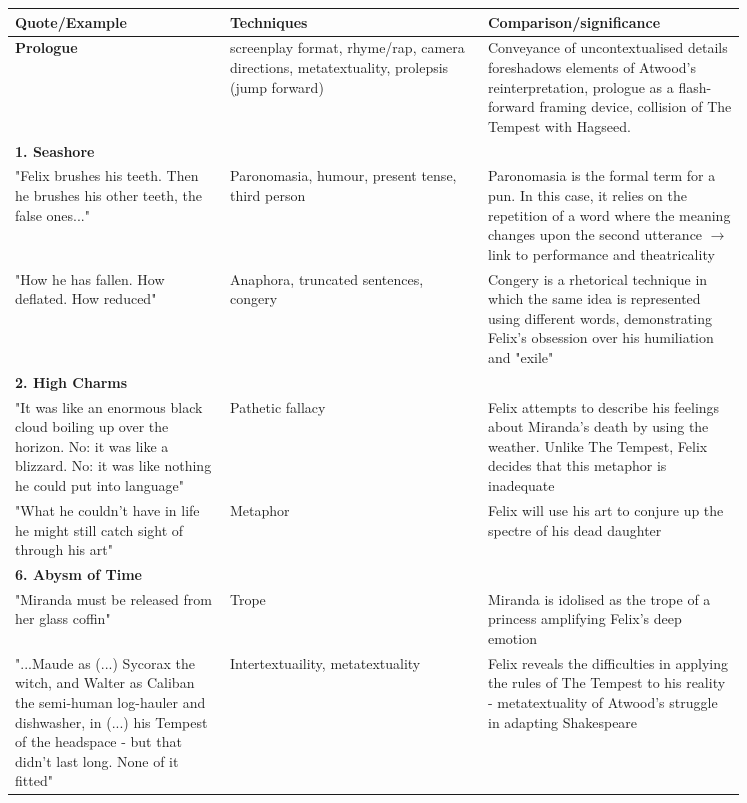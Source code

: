 		\begin{table}[htbp]
			\centering
			\begin{tabular}{ p{0.25\linewidth} | p{0.3\linewidth} | p{0.3\linewidth}}
				Quote/Example	& Techniques	& Comparison/significance \\ \hline
				\textbf{Prologue}	& screenplay format, rhyme/rap, camera directions, metatextuality, prolepsis (jump forward) & Conveyance of uncontextualised details foreshadows elements of Atwood's reinterpretation, prologue as a flash-forward framing device, collision of The Tempest with Hagseed. \\
				\textbf{1. Seashore}	&	&	\\
				"Felix brushes his teeth. Then he brushes his other teeth, the false ones..."	& Paronomasia, humour, present tense, third person	& Paronomasia is the formal term for a pun. In this case, it relies on the repetition of a word where the meaning changes upon the second utterance $\rightarrow$ link to performance and theatricality \\
				"How he has fallen. How deflated. How reduced"	& Anaphora, truncated sentences, congery	& Congery is a rhetorical technique in which the same idea is represented using different words, demonstrating Felix's obsession over his humiliation and "exile"	\\
				\textbf{2. High Charms}	&	&	\\
				"It was like an enormous black cloud boiling up over the horizon. No: it was like a blizzard. No: it was like nothing he could put into language" & Pathetic fallacy	& Felix attempts to describe his feelings about Miranda's death by using the weather. Unlike The Tempest, Felix decides that this metaphor is inadequate \\
				
				"What he couldn't have in life he might still catch sight of through his art" & Metaphor	& Felix will use his art to conjure up the spectre of his dead daughter \\

				\textbf{6. Abysm of Time} & & \\
				"Miranda must be released from her glass coffin"	& Trope	& Miranda is idolised as the trope of a princess amplifying Felix's deep emotion \\

				"...Maude as (...) Sycorax the witch, and Walter as Caliban the semi-human log-hauler and dishwasher, in (...) his Tempest of the headspace - but that didn't last long. None of it fitted" & Intertextuaility, metatextuality & Felix reveals the difficulties in applying the rules of The Tempest to his reality - metatextuality of Atwood's struggle in adapting Shakespeare

			\end{tabular}
		\end{table}

